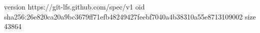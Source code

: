 version https://git-lfs.github.com/spec/v1
oid sha256:26e820ca20a9bc3679ff71efb48249427feebf7040a4b38310a55e8713109002
size 43864
